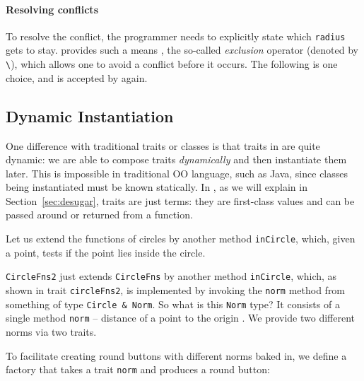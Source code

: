 \paragraph{Resolving conflicts}
To resolve the conflict, the programmer needs to explicitly state which
\lstinline{radius} gets to stay. \name provides such a means , the so-called
\textit{exclusion} operator (denoted by \lstinline{\}), which allows one to
avoid a conflict before it occurs. The following is one choice, and is accepted
by \name again.

\subsection{Dynamic Instantiation}

One difference with traditional traits or classes is that traits in \name are
quite dynamic: we are able to compose traits \textit{dynamically} and then
instantiate them later. This is impossible in traditional OO language, such as
Java, since classes being instantiated must be known statically. In \name, as we
will explain in Section~\ref{sec:desugar}, traits are just terms: they are
first-class values and can be passed around or returned from a function.

Let us extend the functions of circles by another method \lstinline{inCircle},
which, given a point, tests if the point lies inside the circle.

\lstinline{CircleFns2} just extends \lstinline{CircleFns} by another method
\lstinline{inCircle}, which, as shown in trait \lstinline{circleFns2}, is
implemented by invoking the \lstinline{norm} method from something of type
\lstinline{Circle & Norm}. So what is this \lstinline{Norm} type? It consists of
a single method \lstinline{norm} -- distance of a point to the origin . We
provide two different norms via two traits.

To facilitate creating round buttons with different norms baked in, we define a
factory that takes a trait \lstinline$norm$ and produces a round button:

